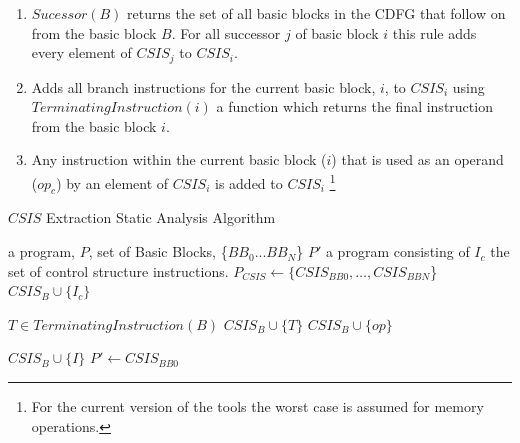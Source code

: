 \begin{enumerate}[label=Rule \arabic*]
    \setlength{\itemsep}{3pt}
    \setlength{\parskip}{0pt}
    \setlength{\parsep}{0pt}
    \item $\mathit{Sucessor(B)}$ returns the set of all basic blocks in the CDFG that follow on from the basic block $B$.
	  For all successor  $j$ of basic block $i$ this rule adds every element of $\mathit{CSIS}_j$ to $\mathit{CSIS}_i$.
    \item Adds all branch instructions for the current basic block, $i$, to $\mathit{CSIS}_i$ using
	  $\mathit{TerminatingInstruction(i)}$ a function which returns the final instruction from the basic block $i$.
    \item Any instruction within the current basic block ($i$) that is used as an operand ($\mathit{op_{c}}$) by an element of $\mathit{CSIS}_i$ is added to $\mathit{CSIS}_i$ \footnote{For the current version of the tools the worst case is assumed for memory operations.}
\end{enumerate}
\vspace{-4pt}

\begin{algorithm}[t]
\caption{$\mathit{CSIS}$ Extraction Static Analysis Algorithm
\label{alg:CSIS-extraction}}
    \begin{algorithmic}[1]
        \INPUT a program, $P$, set of Basic Blocks, \{$\mathit{BB}_0$...$\mathit{BB}_N$\}
        \OUTPUT $P'$ a program consisting of $I_c$ the set of control structure instructions.
        \Statex
            \State $P_{\mathit{CSIS}} \gets \{\mathit{CSIS}_{\mathit{BB0}}, \dots,  \mathit{CSIS}_{BBN}$\}
                \\\hrulefill
                        \State $\mathit{CSIS}_B \cup \{I_{c}\}$
                    \EndFor
                \EndFor
                \\\hrulefill

                \State $T \in TerminatingInstruction(B)$
                \State $\mathit{CSIS}_{B} \cup \{T\}$
                    \State $\mathit{CSIS}_{B} \cup \{op\}$
                \EndFor
                \\\hrulefill

                                \State $\mathit{CSIS}_{B} \cup \{I\}$
                            \EndIf
                        \EndFor
                    \EndFor
                \EndFor
            \EndFor
	\State $P' \gets \mathit{CSIS}_{\mathit{BB0}}$
        \EndWhile
    \end{algorithmic}
\end{algorithm}

